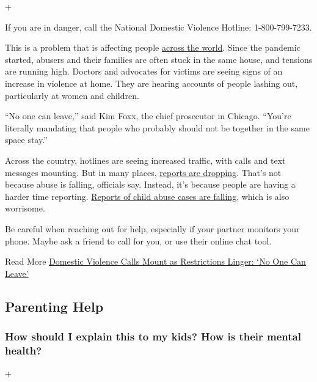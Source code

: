 +

If you are in danger, call the National Domestic Violence Hotline:
1-800-799-7233.

This is a problem that is affecting people
\href{https://www.nytimes3xbfgragh.onion/2020/04/06/world/coronavirus-domestic-violence.html}{across
the world}. Since the pandemic started, abusers and their families are
often stuck in the same house, and tensions are running high. Doctors
and advocates for victims are seeing signs of an increase in violence at
home. They are hearing accounts of people lashing out, particularly at
women and children.

``No one can leave,'' said Kim Foxx, the chief prosecutor in Chicago.
``You're literally mandating that people who probably should not be
together in the same space stay.''

Across the country, hotlines are seeing increased traffic, with calls
and text messages mounting. But in many places,
\href{https://www.nytimes3xbfgragh.onion/2020/04/17/nyregion/new-york-city-domestic-violence-coronavirus.html}{reports
are dropping}. That's not because abuse is falling, officials say.
Instead, it's because people are having a harder time reporting.
\href{https://www.nytimes3xbfgragh.onion/2020/06/09/nyregion/coronavirus-nyc-child-abuse.html}{Reports
of child abuse cases are falling}, which is also worrisome.

Be careful when reaching out for help, especially if your partner
monitors your phone. Maybe ask a friend to call for you, or use their
online chat tool.

 Read More
\href{https://www.nytimes3xbfgragh.onion/2020/05/15/us/domestic-violence-coronavirus.html}{Domestic
Violence Calls Mount as Restrictions Linger: `No One Can Leave'}

\hypertarget{parenting-help}{%
\subsection{Parenting Help}\label{parenting-help}}

\hypertarget{how-should-i-explain-this-to-my-kids-how-is-their-mental-health}{%
\subsubsection{How should I explain this to my kids? How is their mental
health?}\label{how-should-i-explain-this-to-my-kids-how-is-their-mental-health}}

+

